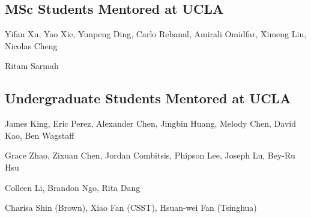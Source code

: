 \subsection{MSc Students Mentored at UCLA}

 {
	 {
		Yifan Xu, Yao Xie, Yunpeng Ding, Carlo Rebanal, Amirali Omidfar, Ximeng Liu, Nicolas Cheng
	}
}

 {
	 {
		Ritam Sarmah
	}
}

\subsection{Undergraduate Students Mentored at UCLA}


 {
	 {
		James King, Eric Perez, Alexander Chen, Jingbin Huang, Melody Chen, David Kao, Ben Wagstaff
	}
}

 {
	 {
		Grace Zhao, Zixuan Chen, Jordan Combitsis, Phipson Lee, Joseph Lu, Bey-Ru Hsu
	}
}


 {
	 {
		Colleen Li, Brandon Ngo, Rita Dang
	}
}

 {
	 {
		Charisa Shin (Brown), Xiao Fan (CSST), Hsuan-wei Fan (Tsinghua)
	}
}

